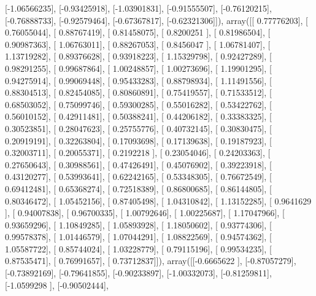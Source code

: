 \documentclass{article}
\begin{document}
       [-1.06566235],
       [-0.93425918],
       [-1.03901831],
       [-0.91555507],
       [-0.76120215],
       [-0.76888733],
       [-0.92579464],
       [-0.67367817],
       [-0.62321306]]), array([[ 0.77776203],
       [ 0.76055044],
       [ 0.88767419],
       [ 0.81458075],
       [ 0.8200251 ],
       [ 0.81986504],
       [ 0.90987363],
       [ 1.06763011],
       [ 0.88267053],
       [ 0.8456047 ],
       [ 1.06781407],
       [ 1.13719282],
       [ 0.89376628],
       [ 0.93918223],
       [ 1.15329798],
       [ 0.92427289],
       [ 0.98291255],
       [ 0.99687864],
       [ 1.00248857],
       [ 1.00273696],
       [ 1.19901295],
       [ 0.94275914],
       [ 0.99069448],
       [ 0.95433283],
       [ 0.88798934],
       [ 1.11491556],
       [ 0.88304513],
       [ 0.82454085],
       [ 0.80860891],
       [ 0.75419557],
       [ 0.71533512],
       [ 0.68503052],
       [ 0.75099746],
       [ 0.59300285],
       [ 0.55016282],
       [ 0.53422762],
       [ 0.56010152],
       [ 0.42911481],
       [ 0.50388241],
       [ 0.44206182],
       [ 0.33383325],
       [ 0.30523851],
       [ 0.28047623],
       [ 0.25755776],
       [ 0.40732145],
       [ 0.30830475],
       [ 0.20919191],
       [ 0.32263804],
       [ 0.17093698],
       [ 0.17139638],
       [ 0.19187923],
       [ 0.32003711],
       [ 0.20055371],
       [ 0.2192218 ],
       [ 0.23054046],
       [ 0.24203363],
       [ 0.27650643],
       [ 0.30988561],
       [ 0.47426491],
       [ 0.45076902],
       [ 0.39223918],
       [ 0.43120277],
       [ 0.53993641],
       [ 0.62242165],
       [ 0.53348305],
       [ 0.76672549],
       [ 0.69412481],
       [ 0.65368274],
       [ 0.72518389],
       [ 0.86800685],
       [ 0.86144805],
       [ 0.80346472],
       [ 1.05452156],
       [ 0.87405498],
       [ 1.04310842],
       [ 1.13152285],
       [ 0.9641629 ],
       [ 0.94007838],
       [ 0.96700335],
       [ 1.00792646],
       [ 1.00225687],
       [ 1.17047966],
       [ 0.93659296],
       [ 1.10849285],
       [ 1.05893928],
       [ 1.18050602],
       [ 0.93774306],
       [ 0.99578378],
       [ 1.01446579],
       [ 1.07044291],
       [ 1.08822569],
       [ 0.94574362],
       [ 1.05587722],
       [ 0.85744024],
       [ 1.03228779],
       [ 0.79115196],
       [ 0.99534235],
       [ 0.87535471],
       [ 0.76991657],
       [ 0.73712837]]), array([[-0.6665622 ],
       [-0.87057279],
       [-0.73892169],
       [-0.79641855],
       [-0.90233897],
       [-1.00332073],
       [-0.81259811],
       [-1.0599298 ],
       [-0.90502444],
\end{document}

